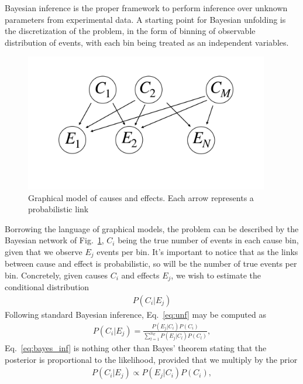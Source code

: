 Bayesian inference is the proper framework to perform inference over unknown parameters from experimental data. A starting point for Bayesian unfolding is the discretization of the problem, in the form of binning of observable distribution of events, with each bin being treated as an independent variables.
%
\begin{figure}[t]
\centering
\includegraphics[page = 1, width=0.95\textwidth]{./figures/graphical_model}
\caption{Graphical model of causes and effects. Each arrow represents a probabilistic link}
\label{fig:graph_model}
\end{figure}
%
Borrowing the language of graphical models, the problem can be described by the Bayesian network of Fig.~\ref{fig:graph_model}, $C_{i}$ being the true number of events in each cause bin, given that we observe $E_{j}$ events per bin.
It's important to notice that as the links between cause and effect is probabilistic, so will be the number of true events per bin. Concretely,  given causes $C_i$ and effects $E_j$, we wish to estimate the conditional distribution
%
\begin{align}\label{eq:unf}
P(C_i | E_j)
\end{align}
%
Following standard Bayesian inference, Eq.~\ref{eq:unf} may be computed as
%
\begin{align}\label{eq:bayes_inf}
P(C_i | E_j) = \frac{P(E_j | C_i) P(C_i)}{\sum_{l=1}^{n_E} P(E_j| C_l) P(C_l)},
\end{align}
Eq.~\ref{eq:bayes_inf} is nothing other than Bayes' theorem stating that the posterior is proportional to the likelihood, provided that we multiply by the prior
%
\begin{align}
P(C_i | E_j) \propto P(E_j | C_i) P(C_i),
\end{align}
